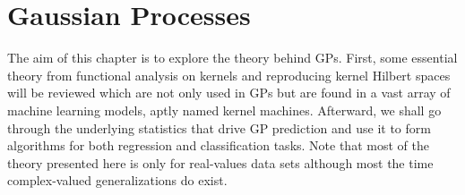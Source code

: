 \section{Gaussian Processes}\label{Chapter1}
The aim of this chapter is to explore the theory behind GPs. First, some essential theory from functional analysis on kernels and reproducing kernel Hilbert spaces will be reviewed which are not only used in GPs but are found in a vast array of machine learning models, aptly named kernel machines. Afterward, we shall go through the underlying statistics that drive GP prediction and use it to form algorithms for both regression and classification tasks. Note that most of the theory presented here is only for real-values data sets although most the time complex-valued generalizations do exist.











